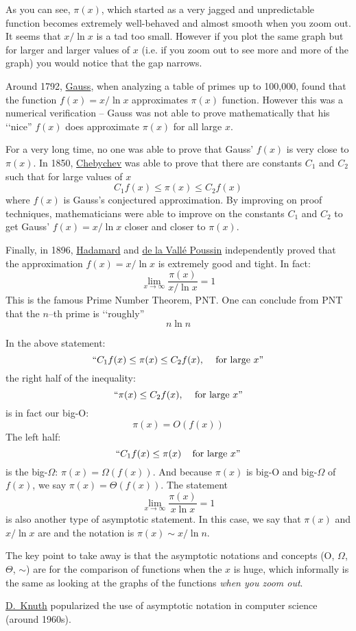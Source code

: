 As you can see, $\pi(x)$, which started as a very jagged and unpredictable function
becomes extremely well-behaved and almost smooth when you zoom out.
It seems that $x/\ln x$ is a tad too small.
However if you plot the same graph 
but for larger and larger values of $x$
(i.e. if you zoom out to see more and more of the graph)
you would notice that the gap narrows.

Around 1792, \href{https://en.wikipedia.org/wiki/Carl_Friedrich_Gauss}{Gauss},
when analyzing a table of primes up to 100,000, found that  
the function $f(x) = x/\ln x$ approximates $\pi(x)$ function.
However this was a numerical verification -- 
Gauss was not able to prove mathematically that his \lq\lq nice''
$f(x)$ does approximate $\pi(x)$ for all large $x$.

For a very long time, no one was able to prove that 
Gauss' $f(x)$ is very close to $\pi(x)$.
In 1850, \href{https://en.wikipedia.org/wiki/Pafnuty_Chebyshev}{Chebychev}
was able to prove that there are constants $C_1$ 
and $C_2$ such that for large values of $x$
\[
C_1 f(x) \leq \pi(x) \leq C_2 f(x)
\]
where $f(x)$ is Gauss's conjectured approximation.
By improving on proof techniques, mathematicians were
able to improve on the constants $C_1$ and $C_2$ to get
Gauss' $f(x) = x/\ln x$ closer and closer to $\pi(x)$.

Finally, in 1896,
\href{https://en.wikipedia.org/wiki/Jacques_Hadamard}{Hadamard}
and
\href{https://en.wikipedia.org/wiki/Charles_Jean_de_la_Vall%C3%A9e_Poussin}{de la Vall\'e Poussin}
  independently 
proved that the approximation $f(x) = x/\ln x$
is extremely good and tight. 
In fact:
\[
\lim_{x \rightarrow \infty} \frac{\pi(x)}{x/\ln x} = 1
\]
This is the famous Prime Number Theorem, PNT.
One can conclude from PNT that the $n$--th prime is \lq\lq roughly''
\[
n \ln n
\]

In the above statement: 
\[
\text{\lq\lq}C_1 f(x) \leq \pi(x) \leq C_2 f(x), \,\,\,\,\,
\text{ for large $x$''}
\]
the right half of the inequality:
\[
\text{\lq\lq}\pi(x) \leq C_2 f(x), \,\,\,\,\,
\text{ for large $x$''}
\]
is in fact our big-O:
\[
\pi(x) = O(f(x))
\]
The left half:
\[
\text{\lq\lq}C_1 f(x) \leq \pi(x) \,\,\,\,\,
\text{ for large $x$''}
\]
is the big-$\Omega$: $\pi(x) = \Omega(f(x))$.
And because $\pi(x)$ is big-O and big-$\Omega$ of $f(x)$,
we say $\pi(x) = \Theta(f(x))$.
The statement
\[
\lim_{x \rightarrow \infty} \frac{\pi(x)}{x \ln x} = 1
\]
is also another type of asymptotic statement.
In this case, we say that $\pi(x)$ and $x / \ln x$ are
and the notation is $\pi(x) \sim x/\ln n$.

The key point to take away is that the asymptotic notations and concepts
(O, $\Omega$, $\Theta$, $\sim$) are for the comparison of functions
when the $x$ is huge, which informally is the same as looking at
the graphs of the functions \textit{when you zoom out}.

\href{https://en.wikipedia.org/wiki/Donald_Knuth}{D.~Knuth}
popularized the use of asymptotic
notation in computer science (around 1960s).

